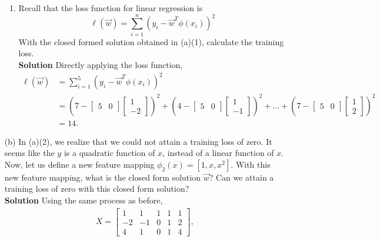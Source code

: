 \documentclass[11pt]{article}
\begin{document}
\begin{enumerate}[(1)]
\begin{enumerate}[(1)]
			\item Recall that the loss function for linear regression is
			$$\ell(\vec{w}) = \sum_{i = 1}^{n} (y_i - \vec{w}^T \phi(x_i))^2$$
			With the closed formed solution obtained in (a)(1), calculate the training loss.
			\newline \\
			\textbf{Solution} Directly applying the loss function,
			\begin{align*}
			\ell(\vec{w}) & = \sum_{i = 1}^{5} (y_i - \vec{w}^T \phi(x_i))^2 \\
			& = (7 -
			\begin{bmatrix}
			5 & 0
			\end{bmatrix} \begin{bmatrix}
			1           \\[0.3em]
			-2
			\end{bmatrix})^2 + (4 -
			\begin{bmatrix}
			5 & 0
			\end{bmatrix} \begin{bmatrix}
			1           \\[0.3em]
			-1
			\end{bmatrix})^2 +...+ (7 -
			\begin{bmatrix}
			5 & 0
			\end{bmatrix} \begin{bmatrix}
			1           \\[0.3em]
			2
			\end{bmatrix})^2 \\
			& = 14.
			\end{align*}
		\end{enumerate}
		\item[(b)]
		In (a)(2), we realize that we could not attain a training loss of zero. It seems like the $y$ is a quadratic function of $x$, instead of a linear function of $x$. Now, let us define a new feature mapping $\phi_2(x) = [1, x, x^2]$. With this new feature mapping, what is the closed form solution $\vec{w}$? Can we attain a training loss of zero with this closed form solution?
		\newline \\
		\textbf{Solution} Using the same process as before,
		\begin{align*}
		X = \begin{bmatrix}
		1 & 1 & 1 & 1 & 1   \\[0.3em]
		-2 & -1 & 0 & 1 & 2 \\[0.3em]
		4 & 1 & 0 & 1 & 4
		\end{bmatrix},\,

\end{align*}
\end{enumerate}
\end{document}
